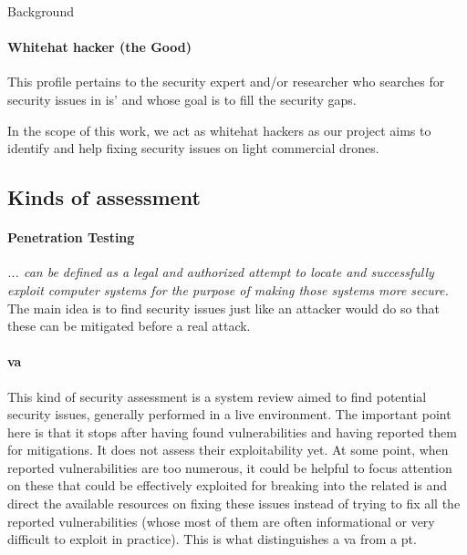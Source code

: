 \begin{chaptercover}{Background}
\paragraph{Whitehat hacker (the {\color{forestgreen(web)} Good})} This profile pertains to the security expert and/or researcher who searches for security issues in \acrshort{is}' and whose goal is to fill the security gaps.

\begin{tip}
In the scope of this work, we act as whitehat hackers as our project aims to identify and help fixing security issues on light commercial drones.
\end{tip}

\subsection{Kinds of assessment}

\paragraph{Penetration Testing} \textit{... can be defined as a legal and authorized attempt to locate and successfully exploit computer systems for the purpose of making those systems more secure.} \cite{basics-of-hacking-and-pt} The main idea is to find security issues just like an attacker would do so that these can be mitigated before a real attack.

\paragraph{\acrfull{va}} This kind of security assessment is a system review aimed to find potential security issues, generally performed in a live environment. The important point here is that it stops after having found vulnerabilities and having reported them for mitigations. It does not assess their exploitability yet. At some point, when reported vulnerabilities are too numerous, it could be helpful to focus attention on these that could be effectively exploited for breaking into the related \acrshort{is} and direct the available resources on fixing these issues instead of trying to fix all the reported vulnerabilities (whose most of them are often informational or very difficult to exploit in practice). This is what distinguishes a \acrlong{va} from a \acrlong{pt}.


\end{chaptercover}
